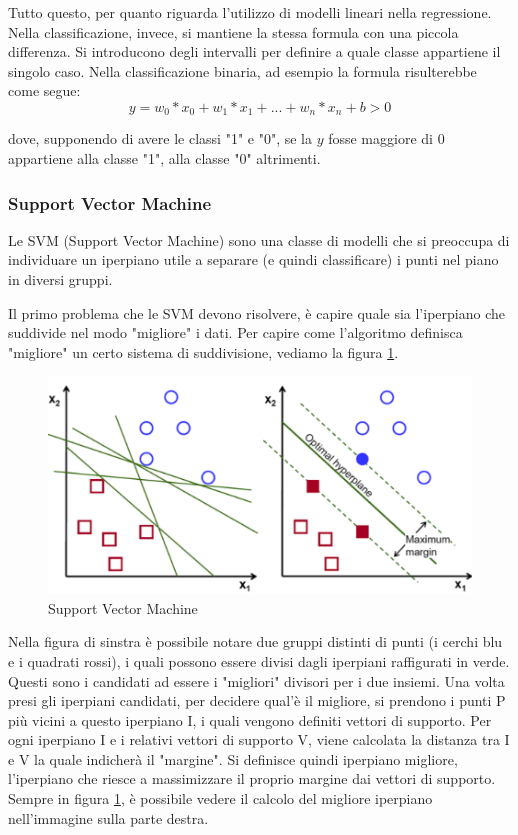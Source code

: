 \documentclass[12pt,italian]{report}
\begin{document}
Tutto questo, per quanto riguarda l'utilizzo di modelli lineari nella regressione. Nella classificazione, invece, si mantiene la stessa formula con una piccola differenza. Si introducono degli intervalli per definire a quale classe appartiene il singolo caso. Nella classificazione binaria, ad esempio la formula risulterebbe come segue:
\[ y = w_{0} * x_{0} + w_{1} * x_{1} + ... + w_{n} * x_{n} + b > 0 \]

dove, supponendo di avere le classi "1" e "0", se la $ y $ fosse maggiore di $ 0 $ appartiene alla classe "1", alla classe "0" altrimenti.
%

\pagebreak

\subsubsection{Support Vector Machine}
Le SVM (Support Vector Machine) sono una classe di modelli che si preoccupa di individuare un iperpiano utile a separare (e quindi classificare) i punti nel piano in diversi gruppi. 

Il primo problema che le SVM devono risolvere, è capire quale sia l'iperpiano che suddivide nel modo "migliore" i dati. Per capire come l'algoritmo definisca "migliore" un certo sistema di suddivisione, vediamo la figura \ref{fig:svc}.

\begin{figure}[h!]
	\center
	\includegraphics[scale=0.4]{../img/svc} %
	\caption{Support Vector Machine}
	\label{fig:svc}
\end{figure}

Nella figura di sinstra è possibile notare due gruppi distinti di punti (i cerchi blu e i quadrati rossi), i quali possono essere divisi dagli iperpiani raffigurati in verde. Questi sono i candidati ad essere i "migliori" divisori per i due insiemi.
Una volta presi gli iperpiani candidati, per decidere qual'è il migliore, si prendono i punti P più vicini a questo iperpiano I, i quali vengono definiti vettori di supporto. Per ogni iperpiano I e i relativi vettori di supporto V, viene calcolata la distanza tra I e V la quale indicherà il "margine". Si definisce quindi iperpiano migliore, l'iperpiano che riesce a massimizzare il proprio margine dai vettori di supporto. Sempre in figura \ref{fig:svc}, è possibile vedere il calcolo del migliore iperpiano nell'immagine sulla parte destra. 
\end{document}

